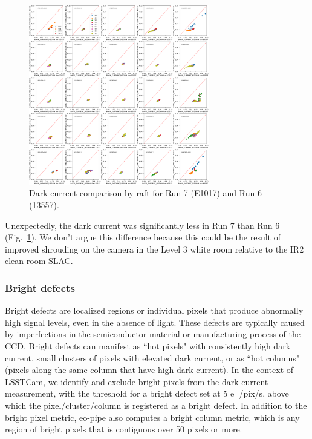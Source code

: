 \begin{figure}[H]
\begin{centering}
\includegraphics[width=0.7\textwidth]{figures/baselineCharacterization/13557_E1071_DARK_CURRENT_MEDIAN.png}
\caption{Dark current comparison by raft for Run 7 (E1017) and Run 6 (13557).}
\label{fig:dark}
\end{centering}
\end{figure}

Unexpectedly, the dark current was significantly less in Run 7 than
Run 6 (Fig.~\ref{fig:dark}). We don't argue this difference because this could be the result of improved shrouding on the camera in the Level 3 white room relative to the IR2 clean room SLAC.

\subsubsection{Bright defects}\label{bright-defects}

Bright defects are localized regions or individual pixels that produce abnormally high signal levels, even in the absence of light. These defects are typically caused by imperfections in the semiconductor material or manufacturing process of the CCD. Bright defects can manifest as ``hot pixels" with consistently high dark current, small clusters of pixels with elevated dark current, or as ``hot columns" (pixels along the same column that have high dark current). In the context of LSSTCam, we identify and exclude bright pixels from the dark current measurement, with the threshold for a bright defect set at 5 e$^-$/pix/s, above which the pixel/cluster/column is registered as a bright defect. In addition to the bright pixel metric, eo-pipe also computes a bright column metric, which is any region of bright pixels that is contiguous over 50 pixels or more.

